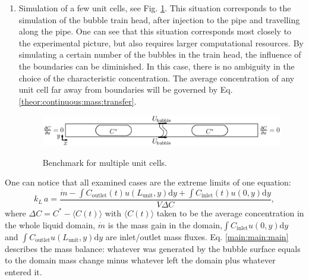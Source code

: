 \documentclass{article}
\newcommand{\beq}{\begin{equation}}
\newcommand{\feq}{\end{equation}}
\newcommand{\vol}{k_L\,a}
\newcommand{\lunit}{L_{\mathrm{unit}}}
\newcommand{\cinlet}{C_{\mathrm{inlet}}}
\newcommand{\coutlet}{C_{\mathrm{outlet}}}
\newcommand{\cstar}{C^{*}}
\begin{document}
\begin{enumerate}
\item 
Simulation of a few unit cells, see Fig. \ref{fig:benchmark:alot}. This situation corresponds to the simulation of the
bubble train head, after injection to the pipe and travelling along the pipe. One can see that this
situation corresponds most closely to the experimental picture, but also requires larger computational
resources. By simulating a certain number of the
bubbles in the train head, the influence of the boundaries can be
diminished. In this case, there is no ambiguity in the choice of the
characteristic concentration. The average concentration of any unit cell far away from boundaries will be governed
by Eq.
\ref{theor:continuous:mass:transfer}. \begin{figure}[htb!]
\includegraphics[width=\textwidth]{Figures/benchmark_alot.eps}\\
\caption{Benchmark for multiple unit cells. \label{fig:benchmark:alot}}
\end{figure}
\end{enumerate} 

One can notice that all examined cases are the extreme limits of one equation:
\beq
\label{main:main:main}
\vol=\frac{\dot{m}-\int{\coutlet(t) u(\lunit,y)\mathrm{d}y}+\int{\cinlet(t) u(0,y)\mathrm{d}y}}{V
\Delta C}, 
\feq
where $\Delta C=\cstar-\langle C(t) \rangle$ with $\langle C(t) \rangle$ taken to be
the average concentration in the whole liquid domain, $\dot{m}$ is the mass gain in
the domain,$\int{\cinlet u(0,y) \mathrm{d}y}$ and $\int{\coutlet
u(\lunit,y)\mathrm{d}y}$ are inlet/outlet mass fluxes. Eq. \ref{main:main:main}
describes the mass balance: whatever was generated by the bubble surface equals
to the domain mass change minus whatever left the domain plus whatever entered it.
\end{document}
